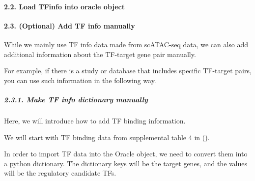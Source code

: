 \documentclass[letterpaper,10pt,english]{sphinxmanual}
\begin{document}
\paragraph{2.2. Load TFinfo into oracle object}
\label{\detokenize{notebooks/04_Network_analysis/Network_analysis_with_with_Paul_etal_2015_data:2.2.-Load-TFinfo-into-oracle-object}}
{
\begin{sphinxVerbatim}[commandchars=\\\{\}]
\llap{\color{nbsphinxin}[11]:\,\hspace{\fboxrule}\hspace{\fboxsep}}

\end{sphinxVerbatim}
}


\paragraph{2.3. (Optional) Add TF info manually}
\label{\detokenize{notebooks/04_Network_analysis/Network_analysis_with_with_Paul_etal_2015_data:2.3.-(Optional)-Add-TF-info-manually}}
While we mainly use TF info data made from scATAC-seq data, we can also add additional information about the TF-target gene pair manually.

For example, if there is a study or database that includes specific TF-target pairs, you can use such information in the following way.


\subparagraph{2.3.1. Make TF info dictionary manually}
\label{\detokenize{notebooks/04_Network_analysis/Network_analysis_with_with_Paul_etal_2015_data:2.3.1.-Make-TF-info-dictionary-manually}}
Here, we will introduce how to add TF binding information.

We will start with TF binding data from supplemental table 4 in ().

In order to import TF data into the Oracle object, we need to convert them into a python dictionary. The dictionary keys will be the target genes, and the values will be the regulatory candidate TFs.
\end{document}
